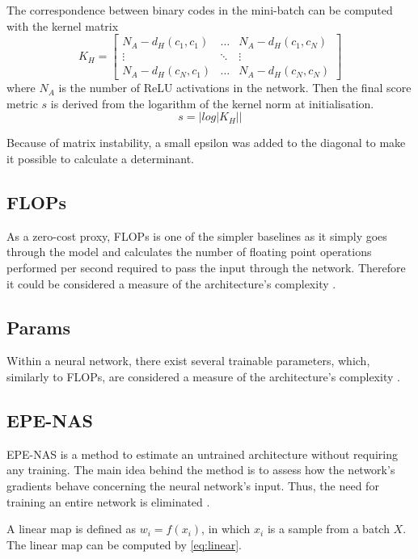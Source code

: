 The correspondence between binary codes in the mini-batch can be computed with the kernel matrix
\begin{equation} 
K_H = \begin{bmatrix} 
        N_A-d_H(c_1, c_1) & \dots & N_A-d_H(c_1, c_N) \\ 
        \vdots & \ddots & \vdots \\ 
        N_A-d_H(c_N, c_1) & \dots & N_A-d_H(c_N, c_N)
    \end{bmatrix} 
\end{equation}
where $N_A$ is the number of ReLU activations in the network. Then the final score metric $s$ is derived from the logarithm of the kernel norm at initialisation. 
\begin{equation}
s = |log|K_H||
\end{equation}


Because of matrix instability, a small epsilon was added to the diagonal to make it possible to calculate a determinant.

\subsection{FLOPs}

As a zero-cost proxy, \Gls{FLOPs} is one of the simpler baselines as it simply goes through the model and calculates the number of floating point operations performed per second required to pass the input through the network. Therefore it could be considered a measure of the architecture's complexity \autocite{ning2021evaluating}. 

\subsection{Params}
Within a neural network, there exist several trainable parameters, which, similarly to FLOPs, are considered a measure of the architecture's complexity \autocite{ning2021evaluating}. 

\subsection{EPE-NAS}
EPE-NAS is a method to estimate an untrained architecture without requiring any training. The main idea behind the method is to assess how the network's gradients behave concerning the neural network's input. Thus, the need for training an entire network is eliminated \autocite{lopes2021epe}. 

A linear map is defined as $w_i = f(x_i)$, in which $x_i$ is a sample from a batch $X$. The linear map can be computed by \cref{eq:linear}. 

